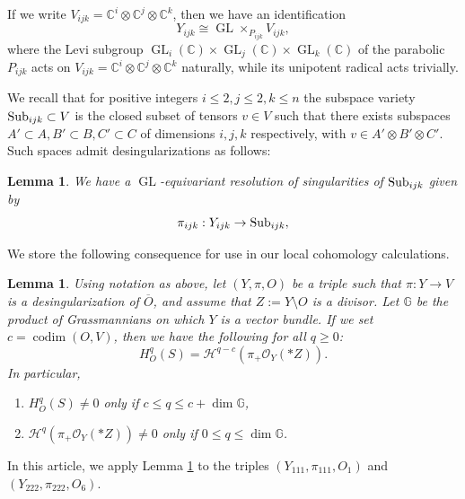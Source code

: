 \documentclass[11pt,reqno]{amsart}
\newcommand{\oo}{\otimes}
\newcommand{\tn}{\textnormal}
\newcommand{\C}{\mathbb{C}}
\newcommand{\GL}{\operatorname{GL}}
\newcommand{\bb}[1]{\mathbb{#1}}
\newcommand{\ol}[1]{\overline{#1}}
\newtheorem{lemma}[theorem]{Lemma}
\numberwithin{equation}{section}
\begin{document}
If we write $V_{ijk}=\C^i \oo \C^j \oo \C^k$, then we have an identification
$$
Y_{ijk}\cong \GL\times_{P_{ijk}} V_{ijk},
$$
where the Levi subgroup $\GL_i(\C) \times \GL_j (\C) \times \GL_k(\C)$ of the parabolic $P_{ijk}$ acts on $V_{ijk}=\C^i \oo \C^j \oo \C^k$ naturally, while its unipotent radical acts trivially.

We recall that for positive integers $i\leq 2,j \leq 2,k \leq n$ the subspace variety $\tn{Sub}_{ijk} \subset V$ is the closed subset of tensors $v \in V$ such that there exists subspaces $A' \subset A, B'\subset B, C'\subset C$ of dimensions $i,j,k$ respectively, with $v \in A' \oo B' \oo C'$. Such spaces admit desingularizations as follows:

\begin{lemma}\label{lem:desing}
We have a $\GL$-equivariant resolution of singularities of $\tn{Sub}_{ijk}$ given by
\[\pi_{ijk}: Y_{ijk} \to \tn{Sub}_{ijk},\]
\end{lemma}

We store the following consequence for use in our local cohomology calculations.

\begin{lemma}\label{pushdownlocallyclosed1}
Using notation as above, let $(Y,\pi,O)$ be a triple such that $\pi:Y\to V$ is a desingularization of $\ol{O}$, and assume that $Z:=Y\setminus O$ is a divisor. Let $\mathbb{G}$ be the product of Grassmannians on which $Y$ is a vector bundle. If we set $c=\operatorname{codim}(O,V)$, then we have the following for all $q\geq 0$:
\begin{equation}\label{pushdownlocallyclosed}
H^q_{O}(S)=\mathcal{H}^{q-c}(\pi_{+}\mathcal{O}_Y(\ast Z)).
\end{equation}
In particular, 
\begin{enumerate}
\item $H^q_{O}(S)\neq 0$ only if $c\leq q\leq  c+\dim \bb{G}$, 
\item $\mathcal{H}^{q}(\pi_{+}\mathcal{O}_Y(\ast Z))	\neq 0$	only if $0\leq q\leq \dim \bb{G}$.
\end{enumerate}

\end{lemma}

In this article, we apply Lemma \ref{pushdownlocallyclosed1} to the triples $(Y_{111},\pi_{111},O_1)$ and $(Y_{222},\pi_{222},O_6)$.
\end{document}

